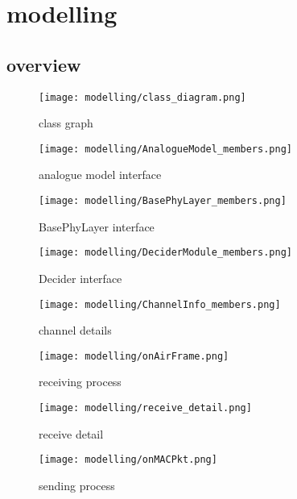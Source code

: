 
\section{modelling}

\subsection{overview}



\begin{figure}[h]
 \centering
 \texttt{[image: modelling/class\_diagram.png]}
 \caption{class graph}
 \label{fig: class graph}
\end{figure}

\begin{figure}[h]
 \centering
 \texttt{[image: modelling/AnalogueModel\_members.png]}
 \caption{analogue model interface}
 \label{fig: analogue model interface}
\end{figure}

\begin{figure}[h]
 \centering
 \texttt{[image: modelling/BasePhyLayer\_members.png]}
 \caption{BasePhyLayer interface}
 \label{fig: BasePhyLayer interface}
\end{figure}

\begin{figure}[h]
 \centering
 \texttt{[image: modelling/DeciderModule\_members.png]}
 \caption{Decider interface}
 \label{fig: Decider interface}
\end{figure}

\begin{figure}[h]
 \centering
 \texttt{[image: modelling/ChannelInfo\_members.png]}
 \caption{channel details}
 \label{fig: channel details}
\end{figure}

\begin{figure}[h]
 \centering
 \texttt{[image: modelling/onAirFrame.png]}
 \caption{receiving process}
 \label{fig: receiving process}
\end{figure}

\begin{figure}[h]
 \centering
 \texttt{[image: modelling/receive\_detail.png]}
 \caption{receive detail}
 \label{fig: receive detail}
\end{figure}

\begin{figure}[h]
 \centering
 \texttt{[image: modelling/onMACPkt.png]}
 \caption{sending process}
 \label{fig: sending process}
\end{figure}
